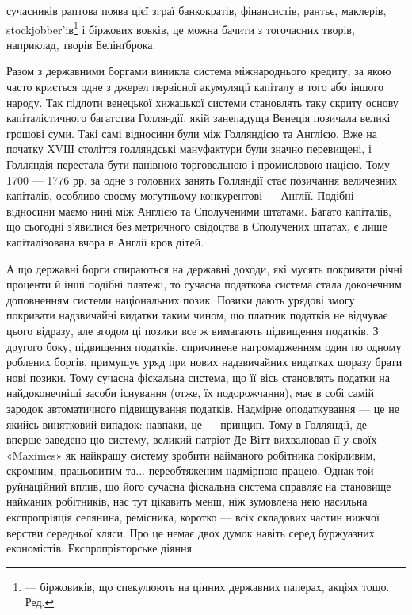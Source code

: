 \parcont{}  %
сучасників раптова поява цієї зграї банкократів, фінансистів, рантьє, маклерів, stockjobber’iв\footnote*{
— біржовиків, що спекулюють на цінних державних паперах, акціях тощо. Ред.
} і
біржових вовків, це можна бачити з тогочасних творів, наприклад, творів Белінґброка.

Разом з державними боргами виникла система міжнароднього кредиту, за якою часто криється одне з
джерел первісної акумуляції капіталу в того або іншого народу. Так підлоти венецької хижацької
системи становлять таку скриту основу капіталістичного
багатства Голляндії, якій занепадуща Венеція позичала великі грошові суми. Такі самі відносини були
між Голляндією та Англією. Вже на початку ХVІІІ століття голляндські мануфактури були значно
перевищені, і Голляндія перестала бути панівною торговельною і промисловою нацією. Тому 1700 — 1776
рр. за одне з головних занять Голляндії стає позичання величезних капіталів, особливо своєму
могутньому конкурентові — Англії. Подібні відносини маємо нині між Англією та Сполученими
штатами. Багато капіталів, що сьогодні з’явилися без метричного свідоцтва в Сполучених штатах, є
лише капіталізована вчора в Англії кров дітей.

А що державні борги спираються на державні доходи, які мусять покривати річні проценти й інші
подібні платежі, то сучасна податкова система стала доконечним доповненням системи національних
позик. Позики дають урядові змогу покривати
надзвичайні видатки таким чином, що платник податків не відчуває цього відразу, але згодом ці позики
все ж вимагають підвищення податків. З другого боку, підвищення податків, спричинене нагромадженням
один по одному роблених боргів, примушує
уряд при нових надзвичайних видатках щоразу брати нові позики. Тому сучасна фіскальна система, що її
вісь становлять податки на найдоконечніші засоби існування (отже, їх подорожчання), має в собі самій
зародок автоматичного підвищування податків. Надмірне оподаткування — це не якийсь винятковий
випадок: навпаки, це — принцип. Тому в Голляндії, де вперше заведено цю систему, великий патріот Де
Вітт вихвалював її у своїх «Maximes» як найкращу систему зробити найманого робітника покірливим,
скромним, працьовитим та... переобтяженим надмірною працею. Однак той руйнаційний вплив, що його
сучасна фіскальна система справляє на становище найманих робітників, нас тут цікавить менш, ніж
зумовлена нею насильна експропріяція селянина, ремісника, коротко — всіх складових частин нижчої
верстви середньої кляси. Про це немає двох думок навіть серед буржуазних економістів.
Експропріяторське діяння
\parbreak{}  %
